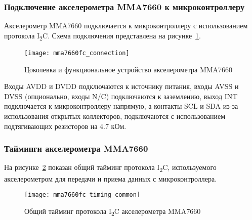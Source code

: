 \documentclass[document.tex]{subfiles}
\begin{document}
\clearpage
\subsubsection{Подключение акселерометра MMA7660 к микроконтроллеру}
Акселерометр MMA7660 подключается к микроконтроллеру с использованием протокола I\textsubscript{2}C. Схема подключения представлена на рисунке~\ref{fig:mma7660fc_connection}.

\begin{figure}[here]
\centering
\texttt{[image: mma7660fc\_connection]}
\caption{Цоколевка и функциональное устройство акселерометра MMA7660}
\label{fig:mma7660fc_connection}
\end{figure}

Входы AVDD и DVDD подключаются к источнику питания, входы AVSS и DVSS (опцио\-нально, входы N/C) подключаются к заземлению, выход INT подключается к микрокон\-троллеру
напрямую, а контакты SCL и SDA из-за использования открытых коллекторов, подключаются с использованием подтягивающих резисторов на 4.7 кОм.

\clearpage
\subsubsection{Тайминги акселерометра MMA7660}
На рисунке~\ref{fig:mma7660fc_timing_common} показан общий тайминг протокола I\textsubscript{2}C, используемого акселерометром для передачи и приема данных с микроконтроллера.
\begin{figure}[here]
\centering
\texttt{[image: mma7660fc\_timing\_common]}
\caption{Общий тайминг протокола I\textsubscript{2}C акселерометра MMA7660}
\label{fig:mma7660fc_timing_common}
\end{figure}
\end{document}
